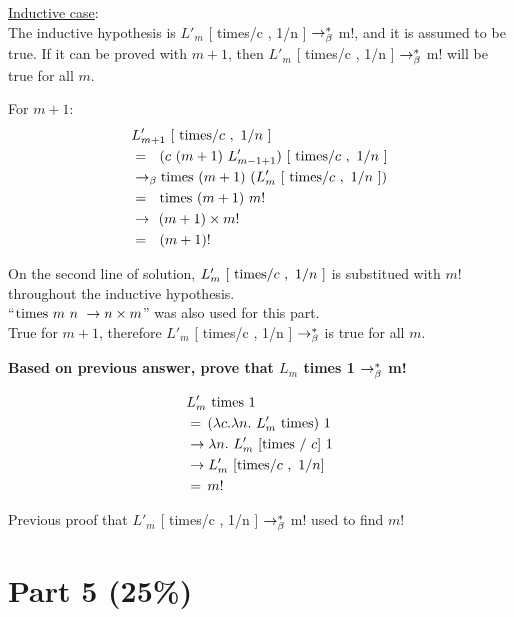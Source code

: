 \documentclass{article}
\begin{document}
\begin{Large}
		\underline{Inductive case}: \\
		
		The inductive hypothesis is $L'_m$ [ times/c , 1/n ] $\rightarrow_\beta^*$  m!, and it is assumed to be true.
		If it can be proved with $m+1$, then $L'_m$ [ times/c , 1/n ] $\rightarrow_\beta^*$  m! will be true for all $m$.
		
		For $m+1$:
		\begin{align*}
			&L_{m+1}^\prime \ [\ \tim / c \ , \ 1/n \ ] \\
			&= \saq (c \ (m+1) \ L_{m-1+1}^\prime ) \ [\ \tim / c \ , \ 1/n \ ] \\
			&\equals \tim \ (m+1) \ ( L_m^\prime \ [\ \tim / c \ , \ 1/n \ ]) \\
			&= \saq \tim \ (m+1) \ m! \\
			&\rightarrow \: \, (m+1) \times  m! \\
			&= \saq (m+1)!
		\end{align*}
		
		On the second line of solution, $L_m^\prime \ [\ \text{times} / c \ , \ 1/n \ ]$ is substitued with $m!$ throughout the inductive hypothesis. \\
		
		``$\text{times} \ m \ n \ \rightarrow n \times m$'' was also used for this part. \\
		
		True for $m+1$, therefore $L'_m$ [ times/c , 1/n ] $\rightarrow_\beta^*$ is true for all $m$. \\
		\newline
		
		\textbf{Based on previous answer, prove that $L_m$ times 1  $\rightarrow_\beta^*$ m!}
		
		\begin{align*}
			&L_m^\prime \ \text{times} \ 1 \\
			&= \, (\lambda c.\lambda n. \ L_m^\prime \ \text{times}) \ 1 \\
			&\rightarrow \lambda n. \ L_m^\prime \ [\text{times} \ / \ c] \ 1 \\
			&\rightarrow L_m^\prime \ [\text{times} /c \ , \ 1/n] \\
			&= \, m!
		\end{align*}
		
		Previous proof that $L'_m$ [ times/c , 1/n ] $\rightarrow_\beta^*$  m! used to find $m!$
	\end{Large}
	\newpage
	
	
	
	\section{Part 5 (25\%)}
	
\end{document}

